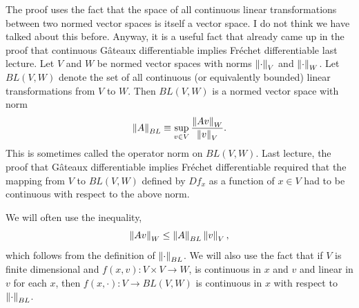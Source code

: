 \begin{remark}
  The proof uses the fact that the space of all continuous linear
  transformations between two normed vector spaces is itself a vector
  space. I do not think we have talked about this before. Anyway, it
  is a useful fact that already came up in the proof that continuous
  G\^{a}teaux differentiable implies Fr\'{e}chet differentiable last
  lecture. Let $V$ and $W$ be normed vector spaces with norms
  $\left\Vert {\cdot} \right\Vert_V$ and $\left\Vert {\cdot} \right\Vert_W$. Let $BL(V,W)$ denote the set
  of all continuous (or equivalently bounded) linear transformations
  from $V$ to $W$. Then $BL(V,W)$ is a normed vector space with norm
  \[ \left\Vert {A} \right\Vert_{BL} \equiv \sup_{v \in V} \frac{\left\Vert {Av} \right\Vert_W}{\left\Vert {v} \right\Vert_V}. \]
  This is sometimes called the operator norm on $BL(V,W)$. Last
  lecture, the proof that G\^{a}teaux differentiable implies
  Fr\'{e}chet differentiable required that the mapping from $V$ to
  $BL(V,W)$ defined by $Df_x$ as a function of $x \in V$ had to be
  continuous with respect to the above norm. 

  We will often use the inequality,
  \[ \left\Vert {Av} \right\Vert_W \leq \left\Vert {A} \right\Vert_{BL} \left\Vert {v} \right\Vert_V, \] which follows from
  the definition of $\left\Vert {\cdot} \right\Vert_{BL}$. We will also use the fact
  that if $V$ is finite dimensional and $f(x,v): V \times V \to W$, is
  continuous in $x$ and $v$ and linear in $v$ for each $x$, then 
  $ f(x, \cdot):V \to BL(V,W)$ is continuous in $x$ with respect to
  $\left\Vert {\cdot} \right\Vert_{BL}$. 
\end{remark}
